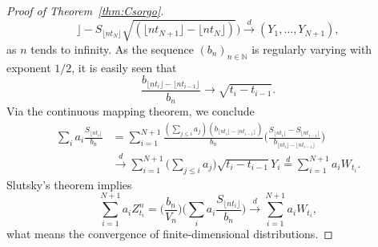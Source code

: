 \documentclass[numbers,compress,v1.0.1]{vmsta}
\theoremstyle{definition}
\def\N{\mathbb{N}}
\begin{document}
\begin{proof}[Proof of Theorem~\ref{thm:Csorgo}]
\[{{\rfloor} - S_{\lfloor n t_{N} \rfloor}}{\sqrt{(\lfloor n t_{N+1}
\rfloor- \lfloor n t_{N} \rfloor)}} \biggr) \stackrel{d} {
\rightarrow} (Y_1, \ldots, Y_{N+1}),
\]
%
as $n$ tends to infinity. As the sequence $(b_n)_{n \in\N}$ is
regularly varying with exponent $1/2$, it is easily seen that
%
\[
\frac{b_{\lfloor n t_i \rfloor- \lfloor n t_{i-1} \rfloor}}{b_n} \rightarrow\sqrt{t_i - t_{i-1}}.
\]
%
Via the continuous mapping theorem, we conclude
%
\begin{align*}
\sum_i a_i \frac{S_{\lfloor n t_i \rfloor}}{b_{n}} &=
\sum_{i=1}^{N+1} \frac{ (\sum_{j \leq i} a_j ) (b_{\lfloor n t_i \rfloor-
\lfloor n t_{i-1} \rfloor})}{b_n} \biggl(
\frac{S_{\lfloor n t_i \rfloor}
- S_{\lfloor n t_{i-1} \rfloor}}{b_{\lfloor n t_i \rfloor- \lfloor n
t_{i-1} \rfloor}} \biggr)
\\
&\stackrel{d} {\rightarrow} \sum_{i=1}^{N+1}
\biggl(\sum_{j \leq i} a_j \biggr)
\sqrt{t_i - t_{i-1}} Y_i \stackrel{d} {=} \sum
_{i=1}^{N+1} a_i
W_{t_i}.
\end{align*}
%
Slutsky's theorem implies
%
\[
\sum_{i=1}^{N+1} a_i
Z^n_{t_i} = \biggl(\frac{b_n}{V_n} \biggr) \biggl(\sum
_i a_i \frac{S_{\lfloor n t_i \rfloor}}{b_{n}} \biggr)
\stackrel{d} {\rightarrow} \sum_{i=1}^{N+1}
a_i W_{t_i},
\]
%
what means the convergence of finite-dimensional distributions.


\end{proof}
\end{document}
